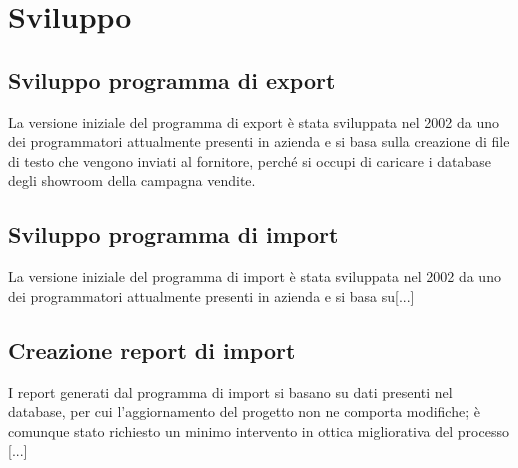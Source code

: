 \section{Sviluppo}
\subsection{Sviluppo programma di export}
La versione iniziale del programma di export è stata sviluppata nel 2002 da uno dei programmatori attualmente presenti in azienda e si basa sulla creazione di file di testo che vengono inviati al fornitore, perché si occupi di caricare i database degli showroom della campagna vendite.\\

\subsection{Sviluppo programma di import}
La versione iniziale del programma di import è stata sviluppata nel 2002 da uno dei programmatori attualmente presenti in azienda e si basa su[...] \\


\subsection{Creazione report di import}
I report generati dal programma di import si basano su dati presenti nel database, per cui l'aggiornamento del progetto non ne comporta modifiche; è comunque stato richiesto un minimo intervento in ottica migliorativa del processo [...]\\